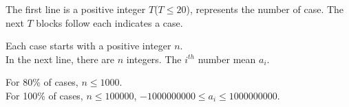 The first line is a positive integer $T$($T \leq 20$), represents the number of case. The next $T$ blocks follow each indicates a case.

Each case starts with a positive integer $n$.\\
In the next line, there are $n$ integers. The $i^{th}$ number mean $a_{i}$.

For 80\% of cases, $n \leq 1000$.\\
For 100\% of cases, $n \leq 100000$, $-1000000000 \leq a_{i} \leq 1000000000$.